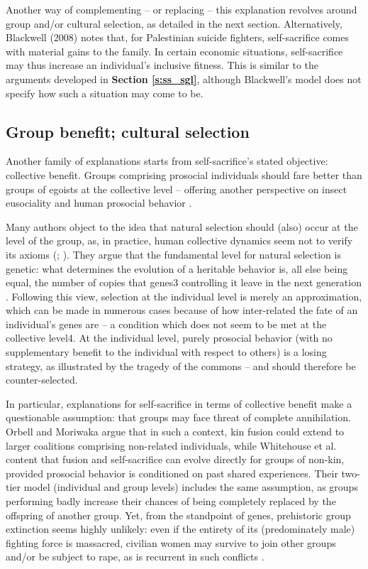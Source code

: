 \documentclass[a4paper,12pt]{report}
\begin{document}
Another way of complementing – or replacing – this explanation revolves around group and/or cultural selection, as detailed in the next section. Alternatively, Blackwell (2008) notes that, for Palestinian suicide fighters, self-sacrifice comes with material gains to the family. In certain economic situations, self-sacrifice may thus increase an individual’s inclusive fitness.
This is similar to the arguments developed in \textbf{Section \ref{s:ss_sgl}}, although
Blackwell’s model does not specify how such a situation may come to be.

\subsection{Group benefit; cultural selection}
Another family of explanations starts from self-sacrifice’s stated objective:
collective benefit. Groups comprising prosocial individuals should fare better
than groups of egoists at the collective level – offering another perspective on insect
eusociality \cite{nowak_evolution_2010} and human prosocial behavior
\cite{wilson_evolution_2008}.

Many authors object to the idea that natural selection should (also) occur at the
level of the group, as, in practice, human collective dynamics seem not to verify
its axioms (; ).
They argue that the fundamental level
for natural selection is genetic: what determines the evolution of a heritable behavior
is, all else being equal, the number of copies that genes3 controlling it leave in the
next generation \cite{dawkins_selfish_1976}. Following this view, selection at the individual level
is merely an approximation, which can be made in numerous cases because of how inter-related
the fate of an individual’s genes are – a condition which does not seem to be met at
the collective level4. At the individual level, purely prosocial behavior
(with no supplementary benefit to the individual with respect to others)
is a losing strategy, as illustrated by the tragedy of the commons \cite{hardin_tragedy_1968}
– and should therefore be counter-selected.

In particular, explanations for self-sacrifice in terms of collective benefit make a
questionable assumption: that groups may face threat of complete annihilation.
Orbell and Moriwaka \citeyear{orbell_evolutionary_2011} argue that in such a context, kin fusion could extend to
larger coalitions comprising non-related individuals, while Whitehouse et al. \citeyear{whitehouse_evolution_2017}
content that fusion and self-sacrifice can evolve directly for groups of non-kin,
provided prosocial behavior is conditioned on past shared experiences. Their two-tier
model (individual and group levels) includes the same assumption, as groups performing
badly increase their chances of being completely replaced by the offspring of another
group. Yet, from the standpoint of genes, prehistoric group extinction seems highly
unlikely: even if the entirety of its (predominately male) fighting force is massacred,
civilian women may survive to join other groups and/or be subject to rape, as is
recurrent in such conflicts \cite{gottschall_explaining_2004}.
\end{document}
